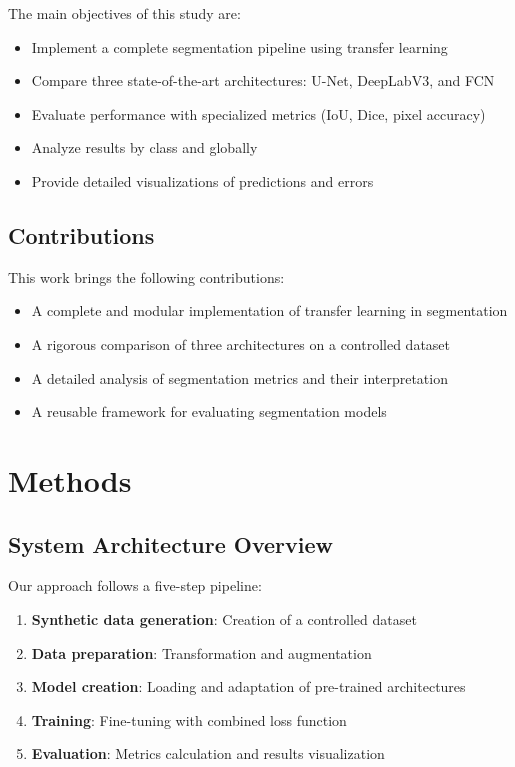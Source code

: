\documentclass[12pt,a4paper]{article}
\begin{document}
The main objectives of this study are:
\begin{itemize}
    \item Implement a complete segmentation pipeline using transfer learning
    \item Compare three state-of-the-art architectures: U-Net, DeepLabV3, and FCN
    \item Evaluate performance with specialized metrics (IoU, Dice, pixel accuracy)
    \item Analyze results by class and globally
    \item Provide detailed visualizations of predictions and errors
\end{itemize}

\subsection{Contributions}

This work brings the following contributions:
\begin{itemize}
    \item A complete and modular implementation of transfer learning in segmentation
    \item A rigorous comparison of three architectures on a controlled dataset
    \item A detailed analysis of segmentation metrics and their interpretation
    \item A reusable framework for evaluating segmentation models
\end{itemize}

\section{Methods}

\subsection{System Architecture Overview}

Our approach follows a five-step pipeline:
\begin{enumerate}
    \item \textbf{Synthetic data generation}: Creation of a controlled dataset
    \item \textbf{Data preparation}: Transformation and augmentation
    \item \textbf{Model creation}: Loading and adaptation of pre-trained architectures
    \item \textbf{Training}: Fine-tuning with combined loss function
    \item \textbf{Evaluation}: Metrics calculation and results visualization
\end{enumerate}
\end{document}
